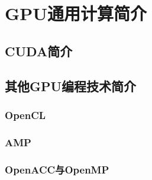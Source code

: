 


\chapter{GPU通用计算简介}

\section{CUDA简介}

\section{其他GPU编程技术简介}

\subsection{OpenCL}
\subsection{AMP}
\subsection{OpenACC与OpenMP}
